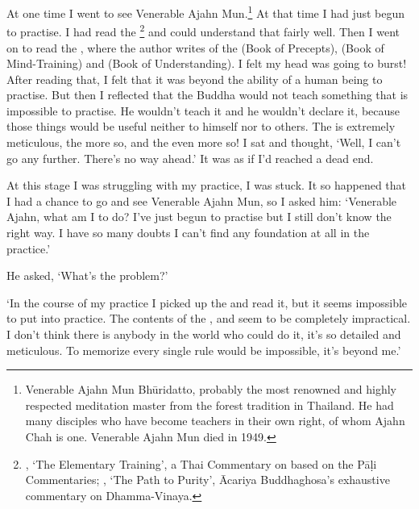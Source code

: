 At one time I went to see Venerable Ajahn Mun.\footnote{Venerable Ajahn Mun Bh\=uridatto, probably the most renowned and highly respected meditation master from the forest tradition in Thailand. He had many disciples who have become teachers in their own right, of whom Ajahn Chah is one. Venerable Ajahn Mun died in 1949.} At that time I had just begun to practise. I had read the \footnote{, `The Elementary Training', a Thai Commentary on  based on the P\=a\d{l}i Commentaries; , `The Path to Purity', \=Acariya Buddhaghosa's exhaustive commentary on Dhamma-Vinaya.} and could understand that fairly well. Then I went on to read the , where the author writes of the  (Book of Precepts),  (Book of Mind-Training) and  (Book of Understanding). I felt my head was going to burst! After reading that, I felt that it was beyond the ability of a human being to practise. But then I reflected that the Buddha would not teach something that is impossible to practise. He wouldn't teach it and he wouldn't declare it, because those things would be useful neither to himself nor to others. The  is extremely meticulous, the  more so, and the  even more so! I sat and thought, `Well, I can't go any further. There's no way ahead.' It was as if I'd reached a dead end.

At this stage I was struggling with my practice, I was stuck. It so happened that I had a chance to go and see Venerable Ajahn Mun, so I asked him: `Venerable Ajahn, what am I to do? I've just begun to practise but I still don't know the right way. I have so many doubts I can't find any foundation at all in the practice.'

He asked, `What's the problem?'

`In the course of my practice I picked up the  and read it, but it seems impossible to put into practice. The contents of the ,  and  seem to be completely impractical. I don't think there is anybody in the world who could do it, it's so detailed and meticulous. To memorize every single rule would be impossible, it's beyond me.'

